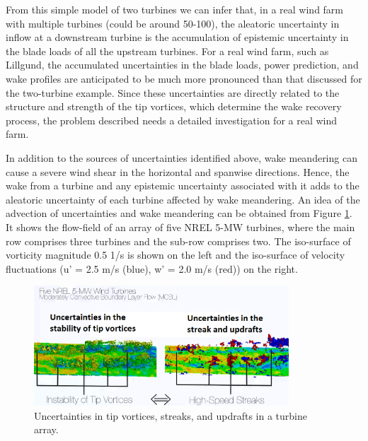 \documentclass[]{aiaa-tc}%
\begin{document}
From this simple model of two turbines we can infer that, in a real wind farm with multiple turbines (could be around 50-100), the aleatoric uncertainty in inflow at a downstream turbine is the accumulation of epistemic uncertainty in the blade loads of all the upstream turbines. For a real wind farm, such as Lillgund,\cite{churchfield:aiaa2012} the accumulated uncertainties in the blade loads, power prediction, and wake profiles are anticipated to be much more pronounced than that discussed for the two-turbine example. Since these uncertainties are directly related to the structure and strength of the tip vortices, which determine the wake recovery process, the problem described needs a detailed investigation for a real wind farm.

In addition to the sources of uncertainties identified above, wake meandering can cause a severe wind shear in the horizontal and spanwise directions. Hence, the wake from a turbine and any epistemic uncertainty associated with it adds to the aleatoric uncertainty of each turbine affected by wake meandering. An idea of the advection of uncertainties and wake meandering can be obtained from Figure \ref{f:UQ2}. It shows the flow-field of an array of five NREL 5-MW turbines, where the main row comprises three turbines and the sub-row comprises two. The iso-surface of vorticity magnitude 0.5 1/s is shown on the left and the iso-surface of velocity fluctuations (u’ = 2.5 m/s (blue), w’ = 2.0 m/s (red)) on the right. 

\begin{figure}
\centering
 \includegraphics[width=0.85\textwidth]{UQ2.png}
 \caption{Uncertainties in tip vortices, streaks, and updrafts in a turbine array.}
 \label{f:UQ2}
\end{figure}
\end{document}
